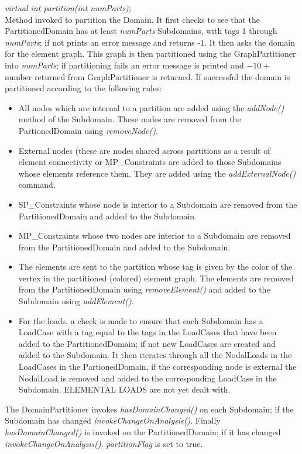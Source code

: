 {\em virtual int partition(int numParts);}\\
Method invoked to partition the Domain. It first checks to see that
the PartitionedDomain has at least {\em numParts} Subdomains, with tags
1 through {\em numParts}; if not prints an error message and returns -1. 
It then asks the domain for the element graph. This graph is then partitioned 
using the GraphPartitioner into {\em numParts}; if partitioning fails an error 
message is printed and  $-10 +$ number returned from GraphPartitioner is
returned. If successful the domain is partitioned according to the
following rules: \begin{itemize}
\item All nodes which are internal to a partition are added using the
{\em addNode()} method of the Subdomain. These nodes are removed from
the PartionedDomain using {\em removeNode()}. 
\item External nodes (these are nodes shared across partitions as a
result of element connectivity or MP\_Constraints are added to those
Subdomains whose elements reference them. They are added using the
{\em addExternalNode()} command. 
\item SP\_Constraints whose node is interior to a Subdomain are removed
from the PartitionedDomain and added to the Subdomain. 
\item MP\_Constraints whose two nodes are interior to a Subdomain are
removed from the PartitionedDomain and added to the Subdomain.
\item The elements are sent to the partition whose tag is given by the
color of the vertex in the partitioned (colored) element graph. The
elements are removed from the PartitionedDomain using {\em
removeElement()} and added to the Subdomain using {\em addElement()}.
\item For the loads, a check is made to ensure that each Subdomain has
a LoadCase with a tag equal to the tags in the LoadCases that have
been added to the PartitionedDomain; if not new LoadCases are created
and added to the Subdomain. It then iterates through all the
NodalLoads in the LoadCases in the PartionedDomain, if the
corresponding node is external the NodalLoad is removed and added to
the corresponding LoadCase in the Subdomain. ELEMENTAL LOADS are not
yet dealt with. 
\end{itemize}

The DomainPartitioner invokes {\em hasDomainChanged()} on each Subdomain; if the Subdomain 
has changed {\em invokeChangeOnAnalysis()}. Finally {\em
hasDomainChanged()} is invoked on the PartitionedDomain; if it has
changed {\em invokeChangeOnAnalysis()}. {\em partitionFlag} is set to
true. \\ 


